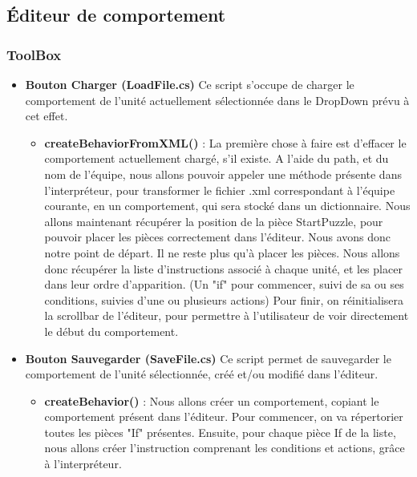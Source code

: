 \documentclass{article}
\begin{document}
\subsection{Éditeur de comportement}
\subsubsection{ToolBox}
\begin{itemize}
\item \textbf{Bouton Charger (LoadFile.cs)}
\smallbreak
Ce script s'occupe de charger le comportement de l'unité actuellement sélectionnée dans le DropDown prévu à cet effet.\newline
\smallbreak
\begin{itemize}
\item\textbf{createBehaviorFromXML()} : La première chose à faire est d'effacer le comportement actuellement chargé, s'il existe.
A l'aide du path, et du nom de l'équipe, nous allons pouvoir appeler une méthode présente dans l’interpréteur, pour transformer le fichier .xml correspondant à l'équipe courante, en un comportement, qui sera stocké dans un dictionnaire.\newline
Nous allons maintenant récupérer la position de la pièce StartPuzzle, pour pouvoir placer les pièces correctement dans l'éditeur. Nous avons donc notre point de départ.\newline 
Il ne reste plus qu'à placer les pièces. Nous allons donc récupérer la liste d'instructions associé à chaque unité, et les placer dans leur ordre d'apparition. (Un "if" pour commencer, suivi de sa ou ses conditions, suivies d'une ou plusieurs actions)\newline
Pour finir, on réinitialisera la scrollbar de l'éditeur, pour permettre à l'utilisateur de voir directement le début du comportement.
\smallbreak
\end{itemize}
\item\textbf{Bouton Sauvegarder (SaveFile.cs)}
\smallbreak
Ce script permet de sauvegarder le comportement de l'unité sélectionnée, créé et/ou modifié dans l'éditeur.\newline
\smallbreak
\begin{itemize}
\item\textbf{createBehavior()} : Nous allons créer un comportement, copiant le comportement présent dans l'éditeur. Pour commencer, on va répertorier toutes les pièces "If" présentes. Ensuite, pour chaque pièce If de la liste, nous allons créer l'instruction comprenant les conditions et actions, grâce à l'interpréteur.\newline

\end{itemize}
\end{itemize}
\end{document}
